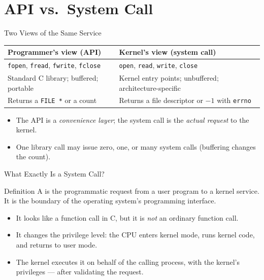 \documentclass[aspectratio=169]{beamer}
\begin{document}

\section{API vs.\ System Call}

\begin{frame}{Two Views of the Same Service}
  \centering
  \renewcommand{\arraystretch}{1.35}
  \begin{tabular}{p{}p{}}
    \textbf{Programmer's view (API)} & \textbf{Kernel's view (system call)} \\
    \hline
    \texttt{fopen}, \texttt{fread}, \texttt{fwrite}, \texttt{fclose} &
    \texttt{open}, \texttt{read}, \texttt{write}, \texttt{close} \\
    Standard C library; buffered; portable &
    Kernel entry points; unbuffered; architecture-specific \\
    Returns a \texttt{FILE *} or a count &
    Returns a file descriptor or $-1$ with \texttt{errno} \\
  \end{tabular}
  \vspace{0.35cm}
  \begin{itemize}
    \item The API is a \emph{convenience layer}; the system call is the
      \emph{actual request} to the kernel.
    \item One library call may issue zero, one, or many system calls
      (buffering changes the count).
  \end{itemize}
\end{frame}

\begin{frame}{What Exactly Is a System Call?}
  \begin{block}{Definition}
    A  is the programmatic request from a user program to a
    kernel service. It is the boundary of the operating system's programming
    interface.
  \end{block}
  \begin{itemize}
    \item It looks like a function call in C, but it is \emph{not} an ordinary
      function call.
    \item It changes the privilege level: the CPU enters kernel mode, runs
      kernel code, and returns to user mode.
    \item The kernel executes it on behalf of the calling process, with the
      kernel's privileges --- after validating the request.
  \end{itemize}
  \vspace{0.15cm}
\end{frame}
\end{document}
